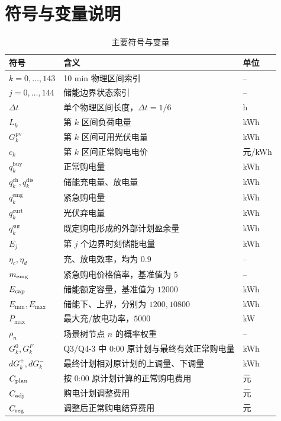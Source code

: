 \documentclass[withoutpreface]{cumcmthesis}
\newcommand{\Emin}{E_{\min}}
\newcommand{\Emax}{E_{\max}}
\newcommand{\Pmax}{P_{\max}}
\newcommand{\dt}{\Delta t}
\newcommand{\qbuy}{q^{\mathrm{buy}}}
\newcommand{\qch}{q^{\mathrm{ch}}}
\newcommand{\qdis}{q^{\mathrm{dis}}}
\newcommand{\qemg}{q^{\mathrm{emg}}}
\newcommand{\qcurt}{q^{\mathrm{curt}}}
\newcommand{\qsur}{q^{\mathrm{sur}}}
\begin{document}
\section{符号与变量说明}
\begin{table}[H]
\centering
\caption{主要符号与变量}
\label{tab:symbols}
\small
\begin{tabularx}{\textwidth}{>{\centering\arraybackslash}p{2.5cm} X >{\centering\arraybackslash}p{2.0cm}}
\toprule
符号 & 含义 & 单位\\
\midrule
$k=0,\ldots,143$ & 10 min 物理区间索引 & --\\
$j=0,\ldots,144$ & 储能边界状态索引 & --\\
$\dt$ & 单个物理区间长度，$\dt=1/6$ & h\\
$L_k$ & 第 $k$ 区间负荷电量 & kWh\\
$G_k^{\mathrm{pv}}$ & 第 $k$ 区间可用光伏电量 & kWh\\
$c_k$ & 第 $k$ 区间正常购电电价 & 元/kWh\\
$\qbuy_k$ & 正常购电量 & kWh\\
$\qch_k,\qdis_k$ & 储能充电量、放电量 & kWh\\
$\qemg_k$ & 紧急购电量 & kWh\\
$\qcurt_k$ & 光伏弃电量 & kWh\\
$\qsur_k$ & 既定购电形成的外部计划盈余量 & kWh\\
$E_j$ & 第 $j$ 个边界时刻储能电量 & kWh\\
$\eta_c,\eta_d$ & 充、放电效率，均为 $0.9$ & --\\
$m_{\rm emg}$ & 紧急购电价格倍率，基准值为 $5$ & --\\
$E_{\rm cap}$ & 储能额定容量，基准值为 $12000$ & kWh\\
$\Emin,\Emax$ & 储能下、上界，分别为 $1200,10800$ & kWh\\
$\Pmax$ & 最大充/放电功率，$5000$ & kW\\
$\rho_n$ & 场景树节点 $n$ 的概率权重 & --\\
$G_k^0,G_k^F$ & Q3/Q4-3 中 0:00 原计划与最终有效正常购电量 & kWh\\
$dG_k^+,dG_k^-$ & 最终计划相对原计划的上调量、下调量 & kWh\\
$C_{\rm plan}$ & 按 0:00 原计划计算的正常购电费用 & 元\\
$C_{\rm adj}$ & 购电计划调整费用 & 元\\
$C_{\rm reg}$ & 调整后正常购电结算费用 & 元\\
\bottomrule
\end{tabularx}
\end{table}
\end{document}
